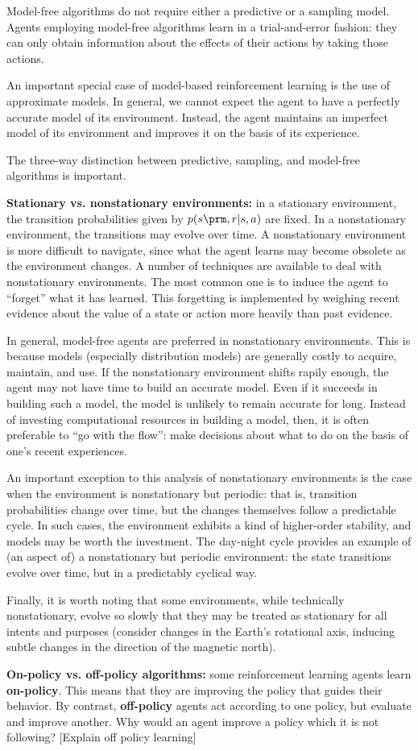\documentclass{my-tufte}
\begin{document}
Model-free algorithms do not require either a predictive or a sampling model.
Agents employing model-free algorithms learn in a trial-and-error fashion: they can only obtain information about the effects of their actions by taking those actions.

An important special case of model-based reinforcement learning is the use of approximate models.
In general, we cannot expect the agent to have a perfectly accurate model of its environment.
Instead, the agent maintains an imperfect model of its environment and improves it on the basis of its experience.

The three-way distinction between predictive, sampling, and model-free algorithms is important.

\textbf{Stationary vs. nonstationary environments:} in a stationary environment, the transition probabilities given by $p(s\prm, r | s, a)$ are fixed.
In a nonstationary environment, the transitions may evolve over time.
A nonstationary environment is more difficult to navigate, since what the agent learns may become obsolete as the environment changes.
A number of techniques are available to deal with nonstationary environments.
The most common one is to induce the agent to ``forget'' what it has learned.
This forgetting is implemented by weighing recent evidence about the value of a state or action more heavily than past evidence.

In general, model-free agents are preferred in nonstationary environments.
This is because models (especially distribution models) are generally costly to acquire, maintain, and use.
If the nonstationary environment shifts rapily enough, the agent may not have time to build an accurate model.
Even if it succeeds in building such a model, the model is unlikely to remain accurate for long.
Instead of investing computational resources in building a model, then, it is often preferable to ``go with the flow'': make decisions about what to do on the basis of one's recent experiences.

An important exception to this analysis of nonstationary environments is the case when the environment is nonstationary but periodic: that is, transition probabilities change over time, but the changes themselves follow a predictable cycle.
In such cases, the environment exhibits a kind of higher-order stability, and models may be worth the investment.
The day-night cycle provides an example of (an aspect of) a nonstationary but periodic environment: the state transitions evolve over time, but in a predictably cyclical way.

Finally, it is worth noting that some environments, while technically nonstationary, evolve so slowly that they may be treated as stationary for all intents and purposes (consider changes in the Earth's rotational axis, inducing subtle changes in the direction of the magnetic north).

\textbf{On-policy vs. off-policy algorithms:} some reinforcement learning agents learn \textbf{on-policy}. 
This means that they are improving the policy that guides their behavior.
By contrast, \textbf{off-policy} agents act according to one policy, but evaluate and improve another.
Why would an agent improve a policy which it is not following?
[Explain off policy learning]
\end{document}
